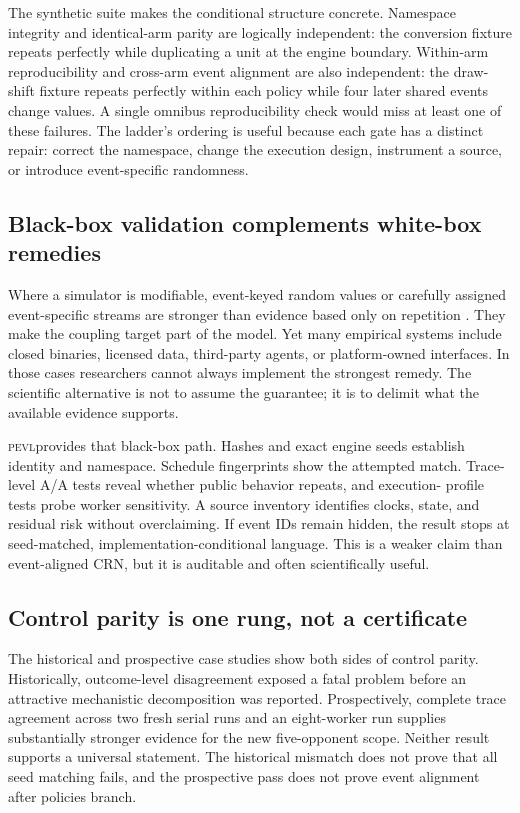 \documentclass[aps,reprint,superscriptaddress,longbibliography,floatfix]{revtex4-2}
\newcommand{\PEVL}{\textsc{pevl}}
\begin{document}
The synthetic suite makes the conditional structure concrete.  Namespace
integrity and identical-arm parity are logically independent: the conversion
fixture repeats perfectly while duplicating a unit at the engine boundary.
Within-arm reproducibility and cross-arm event alignment are also independent:
the draw-shift fixture repeats perfectly within each policy while four later
shared events change values.  A single omnibus reproducibility check would miss
at least one of these failures.  The ladder's ordering is useful because each
gate has a distinct repair: correct the namespace, change the execution design,
instrument a source, or introduce event-specific randomness.

\subsection{Black-box validation complements white-box remedies}

Where a simulator is modifiable, event-keyed random values or carefully
assigned event-specific streams are stronger than evidence based only on
repetition \cite{buffalo2026eventkeyed,lecuyer2002streams}.  They make the
coupling target part of the model.  Yet many empirical systems include closed
binaries, licensed data, third-party agents, or platform-owned interfaces.  In
those cases researchers cannot always implement the strongest remedy.  The
scientific alternative is not to assume the guarantee; it is to delimit what
the available evidence supports.

\PEVL provides that black-box path.  Hashes and exact engine seeds establish
identity and namespace.  Schedule fingerprints show the attempted match.
Trace-level A/A tests reveal whether public behavior repeats, and execution-
profile tests probe worker sensitivity.  A source inventory identifies clocks,
state, and residual risk without overclaiming.  If event IDs remain hidden, the
result stops at seed-matched, implementation-conditional language.  This is a
weaker claim than event-aligned CRN, but it is auditable and often scientifically
useful.

\subsection{Control parity is one rung, not a certificate}

The historical and prospective case studies show both sides of control parity.
Historically, outcome-level disagreement exposed a fatal problem before an
attractive mechanistic decomposition was reported.  Prospectively, complete
trace agreement across two fresh serial runs and an eight-worker run supplies
substantially stronger evidence for the new five-opponent scope.  Neither result
supports a universal statement.  The historical mismatch does not prove that
all seed matching fails, and the prospective pass does not prove event
alignment after policies branch.
\end{document}
